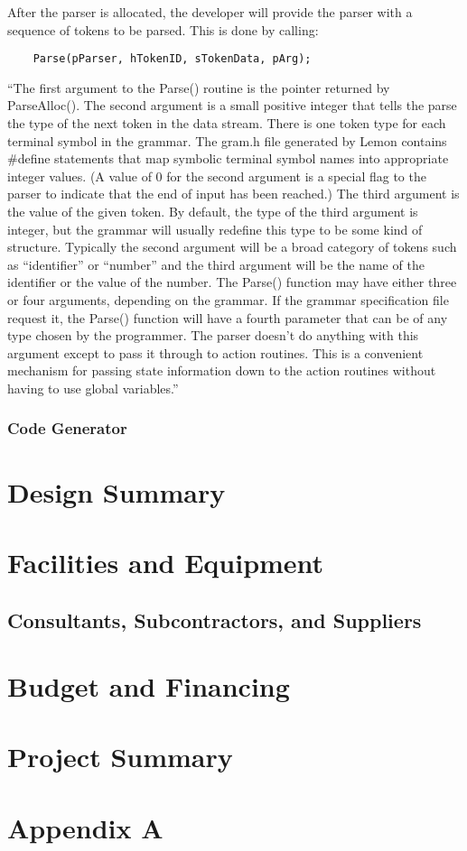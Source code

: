 \documentclass[letterpaper]{article}
\begin{document}
After the parser is allocated, the developer will provide the parser with a sequence of
tokens to be parsed. This is done by calling:
\begin{lstlisting}
	Parse(pParser, hTokenID, sTokenData, pArg);
\end{lstlisting}
“The first argument to the Parse() routine is the pointer returned by ParseAlloc(). The
second argument is a small positive integer that tells the parse the type of the next
token in the data stream. There is one token type for each terminal symbol in the grammar.
The gram.h file generated by Lemon contains \#define statements that map symbolic terminal
symbol names into appropriate integer values. (A value of 0 for the second argument is a
special flag to the parser to indicate that the end of input has been reached.) The third
argument is the value of the given token. By default, the type of the third argument is
integer, but the grammar will usually redefine this type to be some kind of structure.
Typically the second argument will be a broad category of tokens such as ``identifier'' or
``number'' and the third argument will be the name of the identifier or the value of the
number. The Parse() function may have either three or four arguments, depending on the
grammar. If the grammar specification file request it, the Parse() function will have a
fourth parameter that can be of any type chosen by the programmer. The parser doesn't do
anything with this argument except to pass it through to action routines. This is a
convenient mechanism for passing state information down to the action routines without
having to use global variables.”\cite{lemon_parser}

\subsubsection{Code Generator}
\newpage

\section{Design Summary}
\newpage

\section{Facilities and Equipment}
\newpage

\subsection{Consultants, Subcontractors, and Suppliers}
\newpage

\section{Budget and Financing}
\newpage

\section{Project Summary}
\newpage



\newpage

\appendix
\section{Appendix A}
\end{document}
